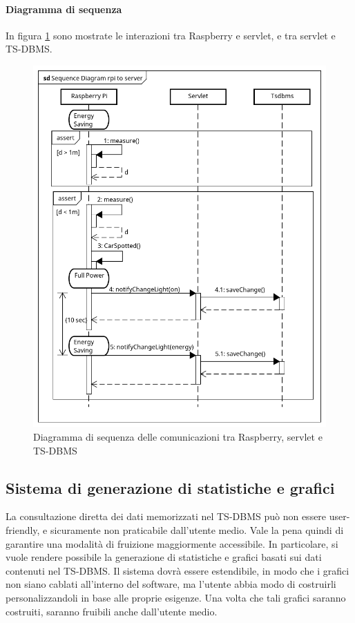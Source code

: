 \paragraph{Diagramma di sequenza}
In figura \ref{SEQ RPI TO SERVER} sono mostrate le interazioni tra Raspberry e servlet, e tra servlet e TS-DBMS.
\begin{figure}[tbp]
	\centering
	\includegraphics[scale=.65]{figure/Sequence_Diagram_rpi_to_server.png}
	\caption{Diagramma di sequenza delle comunicazioni tra Raspberry, servlet e TS-DBMS \label{SEQ RPI TO SERVER}}
\end{figure}

\newpage
\subsection{Sistema di generazione di statistiche e grafici}
La consultazione diretta dei dati memorizzati nel TS-DBMS può non essere user-friendly, e sicuramente non praticabile dall'utente medio. Vale la pena quindi di garantire una modalità di fruizione maggiormente accessibile. In particolare, si vuole rendere possibile la generazione di statistiche e grafici basati sui dati contenuti nel TS-DBMS. Il sistema dovrà essere estendibile, in modo che i grafici non siano cablati all'interno del software, ma l'utente abbia modo di costruirli personalizzandoli in base alle proprie esigenze. Una volta che tali grafici saranno costruiti, saranno fruibili anche dall'utente medio.

